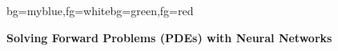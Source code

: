 {

\begin{frame}[plain]
\begin{variableblock}{}{bg=myblue,fg=white}{bg=green,fg=red}
\begin{center}
\textbf{Solving Forward Problems (PDEs) with Neural Networks}
\end{center}
\end{variableblock}
\end{frame}
}
